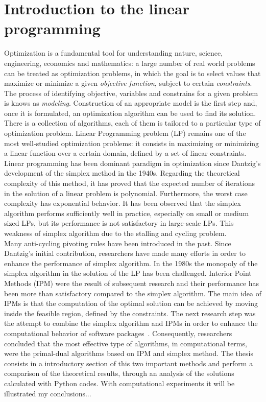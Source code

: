 \documentclass[a4paper,10 pt,titlepage,twoside]{book}
\theoremstyle{plain}
\theoremstyle{definition}
\theoremstyle{remark}
\begin{document}
\chapter{Introduction to the linear programming}
Optimization is a fundamental tool for understanding nature, science, engineering, economics and mathematics: a large number of real world problems can be treated as optimization problems, in which the goal is to select values that maximize or minimize a given \textit{objective function}, subject to certain \textit{constraints}.\\ The process of identifying objective, variables and constrains for a given problem is knows as \textit{modeling}. Construction of an appropriate model is the first step and, once it is formulated, an optimization algorithm can be used to find its solution. There is a collection of algorithms, each of them is tailored to a particular type of optimization problem. Linear Programming problem (LP) remains one of the most well-studied optimization problems: it consists in maximizing or minimizing a linear function over a certain domain, defined by a set of linear constraints.\\
Linear programming has been dominant paradigm in optimization since Dantzig's development of the simplex method in the 1940s. Regarding the theoretical complexity of this method, it has proved that the expected number of iterations in the solution of a linear problem is polynomial. Furthermore, the worst case complexity has exponential behavior. It has been observed that the simplex algorithm performs sufficiently well in practice, especially on small or medium sized LPs, but its performance is not satisfactory in large-scale LPs. This weakness of simplex algorithm due to the stalling and cycling problem.\\
Many anti-cycling pivoting rules have been introduced in the past.
Since Dantzig's initial contribution, researchers have made many efforts in order to enhance the performance of simplex algorithm. In the 1980s the monopoly of the simplex algorithm in the solution of the LP has been challenged. Interior Point Methods (IPM) were the result of subsequent research and their performance has been more than satisfactory compared to the simplex algorithm. The main idea of IPMs is that the computation of the optimal solution can be achieved by moving inside the feasible region, defined by the constraints. The next research step was the attempt to combine the simplex algorithm and IPMs in order to enhance the computational behavior of software packages~\cite{2}. Consequently, researchers concluded that the most effective type of algorithms, in computational terms, were the primal-dual algorithms based on IPM and simplex method. %
The thesis consists in a introductory section of this two important methods and perform a comparison of the theoretical results, through an analysis of the solutions calculated with Python codes. With computational experiments it will be illustrated my conclusions...
\end{document}
